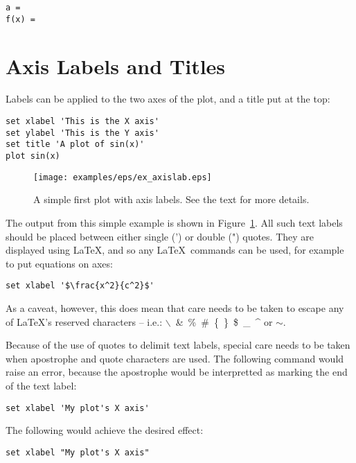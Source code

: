 \begin{verbatim}
a =
f(x) =
\end{verbatim}

\section{Axis Labels and Titles}
\label{sec:latex_incompatibility}

Labels can be applied to the two axes of the plot, and a title put at the top:

\begin{verbatim}
set xlabel 'This is the X axis'
set ylabel 'This is the Y axis'
set title 'A plot of sin(x)'
plot sin(x)
\end{verbatim}

\begin{figure}
\begin{center}
\texttt{[image: examples/eps/ex\_axislab.eps]}
\end{center}
\caption{A simple first plot with axis labels. See the text for more details.}
\label{fig:ex_axislab}
\end{figure}

\noindent The output from this simple example is shown in
Figure~\ref{fig:ex_axislab}. All such text labels should be placed between
either single (') or double (") quotes. They are displayed using \LaTeX, and so
any \LaTeX\ commands can be used, for example to put equations on axes:

\begin{verbatim}
set xlabel '$\frac{x^2}{c^2}$'
\end{verbatim}

\noindent As a caveat, however, this does mean that care needs to be taken to
escape any of \LaTeX's reserved characters -- i.e.:
$\backslash$~\&~\%~\#~\{~\}~\$~\_~\^{} or $\sim$.

Because of the use of quotes to delimit text labels, special care needs to be
taken when apostrophe and quote characters are used. The following command
would raise an error, because the apostrophe would be interpretted as marking
the end of the text label:

\begin{verbatim}
set xlabel 'My plot's X axis'
\end{verbatim}

\noindent The following would achieve the desired effect:

\begin{verbatim}
set xlabel "My plot's X axis"
\end{verbatim}


